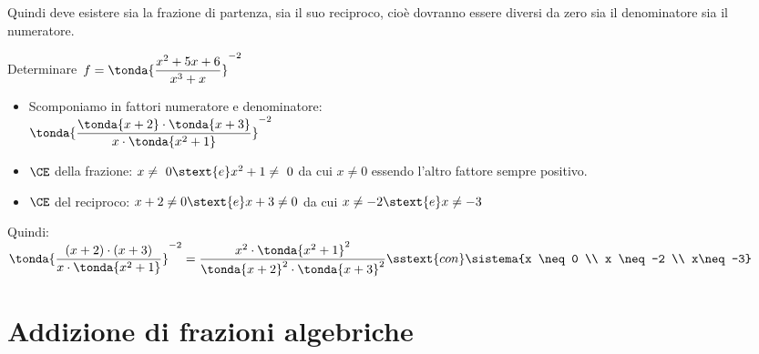 Quindi deve esistere sia la frazione di partenza, sia il suo reciproco, cioè 
dovranno essere diversi da zero sia il denominatore sia il numeratore.

\begin{esempio}{}{}
Determinare~\(f = \tonda{\dfrac{x^{2}+5x+6}{x^{3}+x}} ^{-2}\)
\begin{itemize}[nosep]
\item Scomponiamo in fattori numeratore e denominatore: \\
\( \tonda{\dfrac{ \tonda{x+2} \cdot  \tonda{x+3} }
                          {x\cdot  \tonda{x^{2}+1} }} ^{-2}\)
\item \(\CE\) della frazione: \(x\neq~0 \stext{e} x^2+1\neq~0\) da cui
\(x \neq 0\) essendo l'altro fattore sempre positivo.
\item \(\CE\) del reciproco: \(x+2 \neq 0 \stext{e} x+3 \neq 0\) da cui 
\(x \neq -2 \stext{e} x \neq -3\)
\end{itemize}
Quindi:
\(\tonda{\dfrac{(x+2)\cdot (x+3)}{x\cdot  \tonda{x^2+1} }}^{-2}=
\dfrac{x^2 \cdot \tonda{x^2+1}^2}{\tonda{x+2}^{2} \cdot \tonda{x+3}^2}
\sstext{con} \sistema{x \neq 0 \\ x \neq -2 \\ x\neq-3}\)
\end{esempio}


\section{Addizione di frazioni algebriche}
\label{sec:frazalg_addizione}


